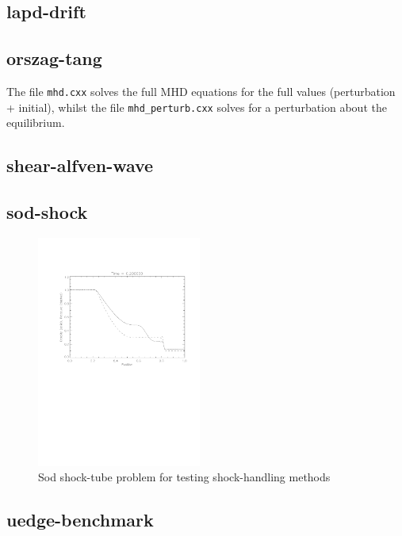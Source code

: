 \documentclass[12pt]{article}
\begin{document}
\subsection{lapd-drift}
%



\subsection{orszag-tang}
%
The file \texttt{mhd.cxx} solves the full MHD equations for the full values
(perturbation + initial), whilst the file \texttt{mhd\_perturb.cxx} solves for
a perturbation about the equilibrium.



\subsection{shear-alfven-wave}
%



\subsection{sod-shock}
%
\begin{figure}[h]
\includegraphics[width=0.48\textwidth, keepaspectratio]{figs/sod_result.pdf}
\caption{Sod shock-tube problem for testing shock-handling methods}
\end{figure}
%



\subsection{uedge-benchmark}
%
\end{document}
